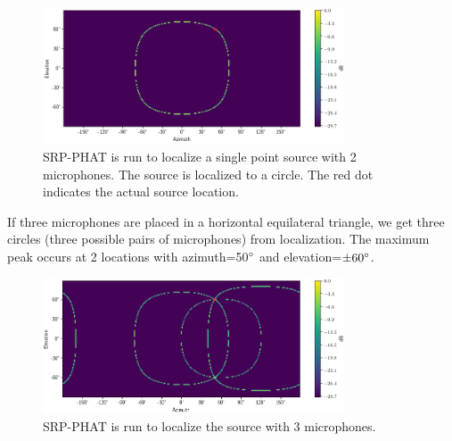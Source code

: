 
\begin{figure}[H]
    \centering
    \includegraphics[width=0.8\textwidth]{Figures/2mic1srcRes.png}
    \caption{SRP-PHAT is run to localize a single point source with 2 microphones. The source is localized to a circle. The red dot indicates the actual source location.}
    \label{fig:2mic1src}
\end{figure}

If three microphones are placed in a horizontal equilateral triangle, we get three circles (three possible pairs of microphones) from localization. The maximum peak occurs at 2 locations with azimuth=50$\degree$ and elevation=$\pm 60\degree$.
\begin{figure}[H]
    \centering
    \includegraphics[width=0.8\textwidth]{Figures/3mic1srcRes.png}
    \caption{SRP-PHAT is run to localize the source with 3 microphones.}
    \label{fig:3mic1src}
\end{figure}

